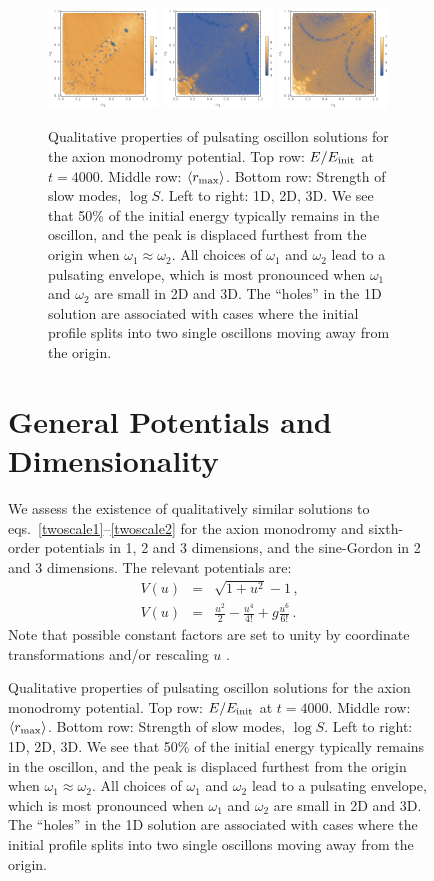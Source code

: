 \documentclass[%
reprint,
superscriptaddress,
amsmath,amssymb,
aps,
prd,
floatfix,
nofootinbib
]{revtex4-1}
\begin{document}
\begin{figure}
\begin{figure}
    \includegraphics[width=0.32\textwidth]{plot/slow-mode-logscale-axion-1d.png}
    \includegraphics[width=0.32\textwidth]{plot/slow-mode-logscale-axion-2d.png}
    \includegraphics[width=0.32\textwidth]{plot/slow-mode-logscale-axion-3d.png}
    \caption{Qualitative properties of pulsating oscillon solutions for the axion monodromy potential. Top row: $E/E_{\rm init}$ at $t=4000$.
      Middle row: $\langle r_{\rm max}\rangle$.
      Bottom row: Strength of slow modes, $\log{S}$.\quad
      Left to right: 1D, 2D, 3D. We see that 50\% of the initial energy typically remains in the oscillon, and the peak is displaced furthest from the origin when $\omega_1 \approx \omega_2$. All choices of  $\omega_1$ and $\omega_2$ lead to a pulsating envelope, which is most pronounced when $\omega_1$ and $\omega_2$ are small in 2D and 3D. The ``holes'' in the 1D solution are associated with cases where the initial profile splits into two single oscillons moving away from the origin.}\label{axion-monodromy}
\end{figure}


\section{General Potentials and Dimensionality}

We  assess the existence of qualitatively similar solutions to eqs.~\ref{twoscale1}--\ref{twoscale2}  for the axion monodromy  and sixth-order potentials in 1, 2 and 3 dimensions, and the sine-Gordon in 2 and 3 dimensions. The relevant potentials are:
%
\begin{eqnarray}
  V(u) &=& \sqrt{1+u^2}-1 \label{axion-potential} \, ,\\
  V(u) &=& \frac{u^2}{2} - \frac{u^4}{4!} +g \frac{ u^6}{6!} \, .
\end{eqnarray}
%
Note that possible constant factors are set to unity by coordinate transformations and/or rescaling $u$ \cite{Amin:2010dc,Amin:2011hj}.


\end{figure}
\end{document}

